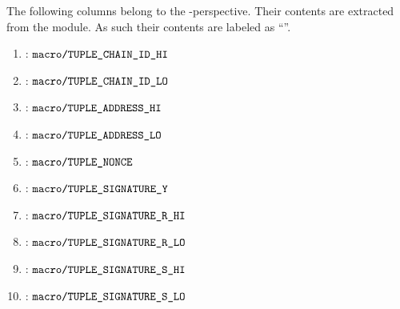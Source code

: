 The following columns belong to the \macro-perspective.
Their contents are extracted from the \rlpTxnMod{} module.
As such their contents are labeled as ``\godGiven{}''.
\begin{enumerate}
	\item \godGiven{}: $\rlpAuthMacroChainIdHi$
	\item \godGiven{}: $\rlpAuthMacroChainIdLo$
	\item \godGiven{}: $\rlpAuthMacroAddressHi$
	\item \godGiven{}: $\rlpAuthMacroAddressLo$
	\item \godGiven{}: $\rlpAuthMacroNonce$
	\item \godGiven{}: $\rlpAuthMacroSignatureYparity$
	\item \godGiven{}: $\rlpAuthMacroSignatureRhi$
	\item \godGiven{}: $\rlpAuthMacroSignatureRlo$
	\item \godGiven{}: $\rlpAuthMacroSignatureShi$
	\item \godGiven{}: $\rlpAuthMacroSignatureSlo$
\end{enumerate}
